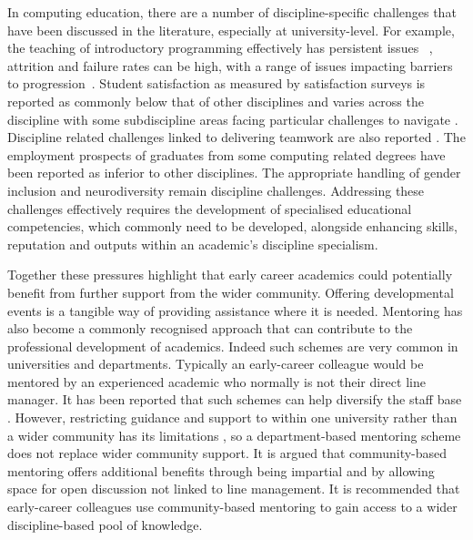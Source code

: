 \documentclass[sigconf]{acmart}
\begin{document}
In computing education, there are a number of discipline-specific
challenges that have been discussed in the literature, especially at
university-level. For example, the teaching of introductory
programming effectively has persistent issues
~\cite{davenport-et-al:latice2016,murphy-et-al:programming2017,simon-et-al:sigcse2018},
attrition and failure rates can be high, with a range of issues
impacting barriers to
progression~\cite{Watson:2014:FRI:2591708.2591749}. Student
satisfaction as measured by satisfaction surveys is reported as
commonly below that of other disciplines \cite{Sinclair2015} and
varies across the discipline with some subdiscipline areas facing
particular challenges to navigate \cite{Knutas2021}. Discipline
related challenges linked to delivering teamwork are also reported
\cite{Gordon2010,Phillips2021}. The employment prospects of graduates
from some computing related degrees have been reported as inferior to
other disciplines\cite{shadbolt2016shadbolt}. The appropriate handling
of gender inclusion \cite{Winter2021} and neurodiversity
\cite{Stuurman2109} remain discipline challenges. Addressing these
challenges effectively requires the development of specialised
educational competencies, which commonly need to be developed,
alongside enhancing skills, reputation and outputs within an
academic’s discipline specialism.

Together these pressures highlight that early career academics could
potentially benefit from further support from the wider
community. Offering developmental events is a tangible way of
providing assistance where it is needed. Mentoring has also become a
commonly recognised approach that can contribute to the professional
development of academics. Indeed such schemes are very common in
universities and departments. Typically an early-career colleague
would be mentored by an experienced academic who normally is not their
direct line manager. It has been reported that such schemes can help
diversify the staff base \cite{Golubchik2018}. However, restricting
guidance and support to within one university rather than a wider
community has its limitations \cite{Golubchik2018}, so a
department-based mentoring scheme does not replace wider community
support.  It is argued that community-based mentoring offers
additional benefits through being impartial and by allowing space for
open discussion not linked to line management. It is recommended that
early-career colleagues use community-based mentoring to gain access
to a wider discipline-based pool of knowledge.
\end{document}
